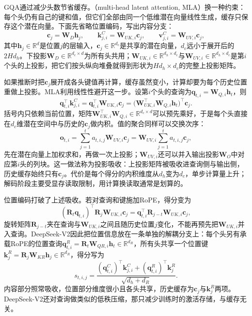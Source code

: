 GQA通过减少头数节省缓存。（multi-head latent attention, MLA）换一种约束：每个头仍有自己的键和值，但它们全部由同一个低维潜在向量线性生成，缓存只保存这个潜在向量。下面先省略位置编码，写出内容分支：
\begin{equation}
 \bm c_j=\bm W_{D}\bm h_j,\qquad
 \bm k_{j,i}^{C}=\bm W_{UK,i}\bm c_j,\qquad
 \bm v_{j,i}^{C}=\bm W_{UV,i}\bm c_j,
 \label{eq:nlp-llm-mla}
\end{equation}
其中$\bm h_j\in\mathbb R^d$是位置$j$的层输入，$\bm c_j\in\mathbb R^{d_c}$是共享的潜在向量，$d_c$远小于展开后的$2Hd_h$。下投影$\bm W_D\in\mathbb R^{d_c\times d}$为所有头共用；$\bm W_{UK,i}\in\mathbb R^{d_h\times d_c}$与$\bm W_{UV,i}\in\mathbb R^{d_h\times d_c}$是第$i$个头的上投影，把它们按头纵向堆叠就得到形状为$Hd_h\times d_c$的完整上投影矩阵。

如果推断时把$\bm c_j$展开成各头键值再计算，缓存虽然变小，计算却要为每个历史位置重做上投影。MLA利用线性性避开这一步。设第$i$个头的查询为$\bm q_{t,i}=\bm W_{Q,i}\bm h_t$，则
\[
 \bm q_{t,i}^{\top}\bm k_{j,i}^{C}
 =\bm q_{t,i}^{\top}\bm W_{UK,i}\bm c_j
 =\bigl(\bm W_{UK,i}^{\top}\bm W_{Q,i}\bm h_t\bigr)^{\top}\bm c_j .
\]
括号内只依赖当前位置，矩阵$\bm W_{UK,i}^{\top}\bm W_{Q,i}\in\mathbb R^{d_c\times d}$可以预先乘好，于是每个头直接在$d_c$维潜在空间中与历史的$\bm c_j$做内积。值的聚合同样可以交换次序：
\begin{equation}
 \bm o_{t,i}=\sum_{j=1}^{t}a_{t,i,j}\bm W_{UV,i}\bm c_j
 =\bm W_{UV,i}\sum_{j=1}^{t}a_{t,i,j}\bm c_j,
 \label{eq:nlp-llm-mla-value}
\end{equation}
先在潜在向量上加权求和，再做一次上投影；$\bm W_{UV,i}$还可以并入输出投影$\bm W_O$中对应第$i$头的列块。这一做法称为投影吸收：上投影矩阵被吸收进查询侧与输出侧，历史缓存始终只有$\bm c_j$。代价是每个得分的内积维度从$d_h$变为$d_c$，单步计算量上升；解码阶段主要受显存读取限制，用计算换读取通常是划算的。

位置编码打破了上述吸收。若对查询和键施加RoPE，得分变为
\[
 (\bm R_t\bm q_{t,i})^{\top}\bm R_j\bm W_{UK,i}\bm c_j=\bm q_{t,i}^{\top}\bm R_{j-t}\bm W_{UK,i}\bm c_j ,
\]
旋转矩阵$\bm R_{j-t}$夹在查询与$\bm W_{UK,i}$之间且随历史位置$j$变化，不能再预先把$\bm W_{UK,i}$并入查询。DeepSeek-V2因此把位置信息放在一条单独的解耦分支上：每个头另有承载RoPE的位置查询$\bm q_{t,i}^{R}=\bm R_t\bm W_{QR,i}\bm h_t\in\mathbb R^{d_R}$，所有头共享一个位置键$\bm k_j^{R}=\bm R_j\bm W_{KR}\bm h_j\in\mathbb R^{d_R}$，得分写为
\[
 s_{t,i,j}=\frac{(\bm q_{t,i}^{C})^{\top}\bm k_{j,i}^{C}+(\bm q_{t,i}^{R})^{\top}\bm k_j^{R}}{\sqrt{d_h+d_R}} .
\]
内容部分照常吸收，位置部分维度很小且各头共享，历史缓存为$\bm c_j$与$\bm k_j^{R}$两项。DeepSeek-V2还对查询做类似的低秩压缩，那只减少训练时的激活存储，与缓存无关。

